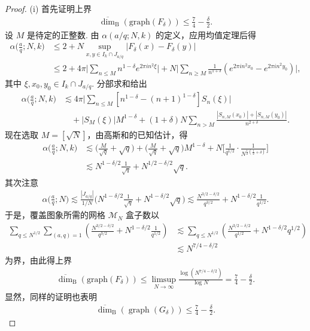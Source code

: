 \begin{proof}
(i) 首先证明上界
\begin{align*}
  \overline{\dim}_{\mathrm{B}}(\mathrm{graph}(F_{\delta}))\leq\frac{7}{4}-\frac{\delta}{2}.
\end{align*}
设 $M$ 是待定的正整数. 由 $\alpha(a/q; N, k)$ 的定义，应用均值定理后得
\begin{align*}
  \alpha\Big(\frac{a}{q};N,k\Big)
  &\leq 2+N\sup_{x,y\in I_{k}\cap J_{a/q}}|F_{\delta}(x)-F_{\delta}(y)|\\
  &\leq 2+4\pi\Big|\sum_{n\leq M}n^{1-\delta}e^{2\pi i n^{2}\xi}\Big|
   +N\Big|\sum_{n\geq M}\frac{1}{n^{1+\delta}}\left(e^{2\pi i n^{2}x_{0}}-e^{2\pi i n^{2}y_{0}}\right)\Big|,
\end{align*}
其中 $\xi, x_0, y_0 \in I_k \cap J_{a/q}$. 分部求和给出
\begin{align*}
  \alpha\Big(\frac{a}{q};N,k\Big)
  &\lesssim 4\pi\Big|\sum_{n\leq M}\left[n^{1-\delta}-\left(n+1\right)^{1-\delta}\right]S_{n}(\xi)\Big|\\
  &\quad+\left|S_{M}(\xi)\right|M^{1-\delta}
   +\left(1+\delta\right)N\sum_{n>M}\frac{\left|S_{n,M}(x_{0})\right|+\left|S_{n,M}(y_{0})\right|}{n^{2+\delta}}.
\end{align*}
现在选取 $M = [\sqrt{N}]$，由高斯和的已知估计，得
\begin{align*}
  \alpha\Big(\frac{a}{q};N,k\Big)
  &\lesssim\Big(\frac{M}{\sqrt{q}}+\sqrt{q}\Big)+\Big(\frac{M}{\sqrt{q}}+\sqrt{q}\Big)M^{1-\delta}
   +N\Big[\frac{1}{q^{1/2}}\cdot\frac{1}{N^{\frac{1}{2}(\frac{1}{2}+\delta)}}\Big]\\
  &\lesssim N^{1-\delta/2}\frac{1}{\sqrt{q}}+N^{1/2-\delta/2}\sqrt{q}.
\end{align*}
其次注意
\begin{align*}
  \alpha\Big(\frac{a}{q};N\Big)
  \lesssim\frac{|J_{a/q}|}{1/N}\Big(N^{1-\delta/2}\frac{1}{\sqrt{q}}+N^{1-\delta/2}\sqrt{q}\Big)
  \lesssim\frac{N^{3/2-\delta/2}}{q^{3/2}}+N^{1-\delta/2}\frac{1}{q^{1/2}}.
\end{align*}
于是，覆盖图象所需的网格 $\mathcal{M}_N$ 盒子数以
\begin{align*}
  \sum_{q\leq N^{1/2}}\sum_{(a,q)=1}\left(\frac{N^{3/2-\delta/2}}{q^{3/2}}+N^{1-\delta/2}\frac{1}{q^{1/2}}\right)
  &\lesssim\sum_{q\leq N^{1/2}}\left(\frac{N^{3/2-\delta/2}}{q^{1/2}}+N^{1-\delta/2}q^{1/2}\right)\\
  &\lesssim N^{7/4-\delta/2}
\end{align*}
为界，由此得上界
\begin{align*}
  \overline{\dim}_{\mathrm{B}}(\mathrm{graph}(F_{\delta}))
  \leq\limsup_{N\to\infty}\frac{\log(N^{7/4-\delta/2})}{\log N}
  =\frac{7}{4}-\frac{\delta}{2}.
\end{align*}
显然，同样的证明也表明
\begin{align*}
  \overline{\dim}_{\mathrm{B}}(\operatorname{graph}(G_{\delta}))\leq\frac{7}{4}-\frac{\delta}{2}.
\end{align*}


\end{proof}
